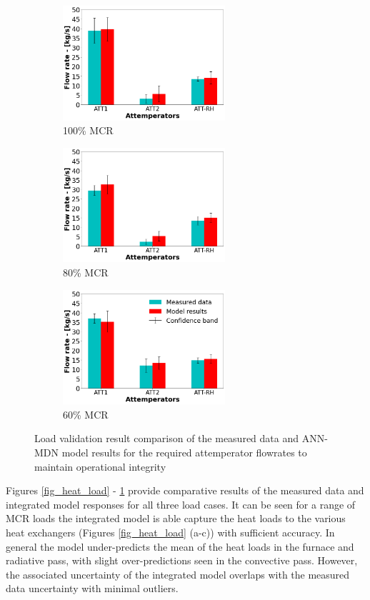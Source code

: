 \documentclass[a4paper,fleqn]{cas-dc}
\begin{document}
\begin{figure}
\centering
\begin{subfigure}{0.33\textwidth}
    \includegraphics[width=\linewidth, height = 4.25cm]{100_CASE_ATTEMP}
    \caption{100\% MCR}
\end{subfigure}\hfill %
\begin{subfigure}{0.33\textwidth}
    \includegraphics[width=\linewidth, height = 4.25cm]{80_CASE_ATTEMP}
    \caption{80\% MCR}
\end{subfigure}\hfill
\begin{subfigure}{0.33\textwidth}
    \includegraphics[width=\linewidth, height = 4.25cm]{60_CASE_ATTEMP}
    \caption{60\% MCR}
\end{subfigure}
\caption{Load validation result comparison of the measured data and ANN-MDN model results for the required attemperator flowrates to maintain operational integrity}
\label{fig_attemp}
\end{figure}

Figures \ref{fig_heat_load} - \ref{fig_attemp} provide comparative results of the measured data and integrated model responses for all three load cases. It can be seen for a range of MCR loads the integrated model is able capture the heat loads to the various heat exchangers (Figures \ref{fig_heat_load} (a-c)) with sufficient accuracy. In general the model under-predicts the mean of the heat loads in the furnace and radiative pass, with slight over-predictions seen in the convective pass. However, the associated uncertainty of the integrated model overlaps with the measured data uncertainty with minimal outliers.\\ 
\end{document}
